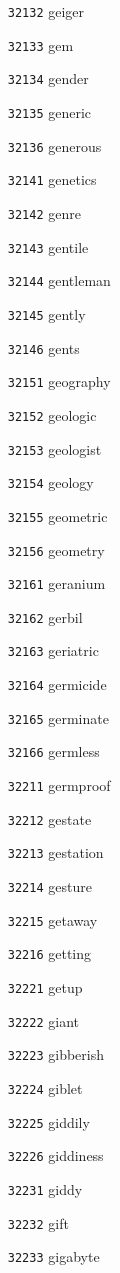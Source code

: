 \documentclass[twoside,11pt]{article}
\begin{document}
\begin{multicols}{5}
\begin{enumerate}
\item[\texttt{32132}] geiger
\item[\texttt{32133}] gem
\item[\texttt{32134}] gender
\item[\texttt{32135}] generic
\item[\texttt{32136}] generous
\item[\texttt{32141}] genetics
\item[\texttt{32142}] genre
\item[\texttt{32143}] gentile
\item[\texttt{32144}] gentleman
\item[\texttt{32145}] gently
\item[\texttt{32146}] gents
\item[\texttt{32151}] geography
\item[\texttt{32152}] geologic
\item[\texttt{32153}] geologist
\item[\texttt{32154}] geology
\item[\texttt{32155}] geometric
\item[\texttt{32156}] geometry
\item[\texttt{32161}] geranium
\item[\texttt{32162}] gerbil
\item[\texttt{32163}] geriatric
\item[\texttt{32164}] germicide
\item[\texttt{32165}] germinate
\item[\texttt{32166}] germless
\item[\texttt{32211}] germproof
\item[\texttt{32212}] gestate
\item[\texttt{32213}] gestation
\item[\texttt{32214}] gesture
\item[\texttt{32215}] getaway
\item[\texttt{32216}] getting
\item[\texttt{32221}] getup
\item[\texttt{32222}] giant
\item[\texttt{32223}] gibberish
\item[\texttt{32224}] giblet
\item[\texttt{32225}] giddily
\item[\texttt{32226}] giddiness
\item[\texttt{32231}] giddy
\item[\texttt{32232}] gift
\item[\texttt{32233}] gigabyte

\end{enumerate}
\end{multicols}
\end{document}
